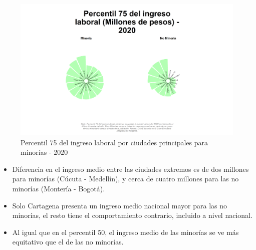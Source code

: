     \begin{figure}[H]
        \caption{Percentil 75 del ingreso laboral por ciudades principales para minorías - 2020 \label{map_result_2} }
        \begin{center}
        \includegraphics[width=\textwidth,keepaspectratio]{img/var_24_static.png}
        \end{center}
    \end{figure}
            \begin{itemize}
                    \item Diferencia en el ingreso medio entre las ciudades extremos es de dos millones para minorías (Cúcuta - Medellín), y cerca de cuatro millones para las no minorías (Montería - Bogotá).
                    \item Solo Cartagena presenta un ingreso medio nacional mayor para las no minorías, el resto tiene el comportamiento contrario, incluido a nivel nacional.
                    \item Al igual que en el percentil 50, el ingreso medio de las minorías se ve más equitativo que el de las no minorías.
                \end{itemize}


